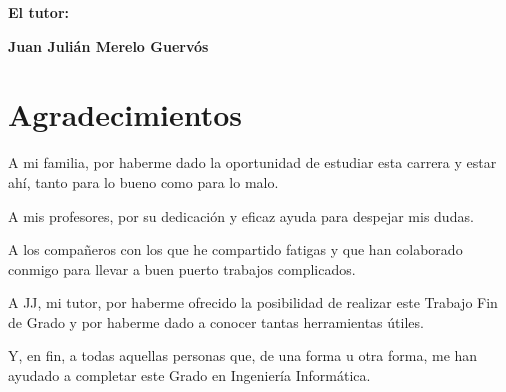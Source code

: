 \textbf{El tutor:}

\vspace{5cm}

\noindent \textbf{Juan Julián Merelo Guervós}

\chapter*{Agradecimientos}
\thispagestyle{empty}

       \vspace{1cm}


A mi familia, por haberme dado la oportunidad de estudiar esta carrera y estar ahí, tanto para lo bueno como para lo malo.\par
\medskip
A mis profesores, por su dedicación y eficaz ayuda para despejar mis dudas.\par
\medskip
A los compañeros con los que he compartido fatigas y que han colaborado conmigo para llevar a buen puerto trabajos complicados.\par
\medskip
A JJ, mi tutor, por haberme ofrecido la posibilidad de realizar este Trabajo Fin de Grado y por haberme dado a conocer tantas herramientas útiles.\par
\medskip
Y, en fin, a todas aquellas personas que, de una forma u otra forma, me han ayudado a completar este Grado en Ingeniería Informática.\par
\medskip
